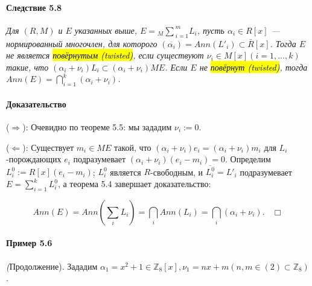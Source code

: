 \documentclass[a4paper,12pt]{article}
\newcommand{\dirsummod}[1]{{_{{#1}}\!\!\sum}}
\begin{document}
\paragraph{Следствие 5.8}
{\itshape
	Для $(R, M)$ и $E$ указанных выше, $E = \dirsummod{M}_{i=1}^m L_i$, пусть $\alpha_i \in R[x]$ --- нормированный многочлен, для которого $(\overline{\alpha_i}) = Ann(L'_i) \subset \bar{R}[x]$. Тогда $E$ не является \hl{повёрнутым (twisted)}, если существуют $\nu_i \in M[x] (i = 1, ..., k)$ такие, что $(\alpha_i + \nu_i)L_i \subset (\alpha_i + \nu_i) M E$. Если $E$ не \hl{повёрнут (twisted)}, тогда $Ann(E) = \bigcap_{i=1}^k (\alpha_i + \nu_i)$. 
}

\paragraph{Доказательство}
($\Rightarrow$): Очевидно по теореме 5.5: мы зададим $\nu_i := 0$.

($\Leftarrow$): Существует $m_i \in M E$ такой, что $(\alpha_i + \nu_i)e_i = (\alpha_i + \nu_i) m_i$ для $L_i$-порождающих $e_i$ подразумевает $(\alpha_i + \nu_i)(e_i - m_i) = 0$. Определим $L_i^0 := R[x](e_i - m_i)$; $L_i^0$ является $R$-свободным, и $\overline{L_i^0} = L'_i$ подразумевает $E = \sum_{i = 1}^{k} L_i^0$, а теорема 5.4 завершает доказательство:

$$
Ann(E) = Ann\left(\sum_i L_i \right) = \bigcap_i Ann(L_i) = \bigcap_i (\alpha_i + \nu_i). ~~~~ \Box
$$

\paragraph{Пример 5.6} \textit(Продолжение).
Зададим $\alpha_1 = x^2 + 1 \in \mathbb{Z}_8[x], \nu_1 = nx + m (n, m \in (2) \subset \mathbb{Z}_8)$.
\end{document}
